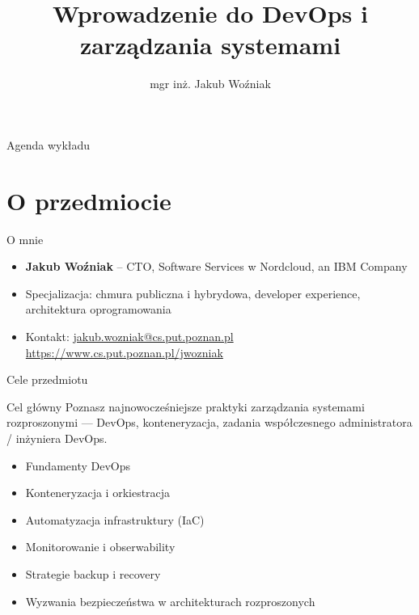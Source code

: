 \documentclass[aspectratio=169]{beamer}
\title[DevOps i administrowanie]{Wprowadzenie do DevOps i zarządzania systemami}
\author{mgr inż. Jakub Woźniak}
\institute{Instytut Informatyki, Wydział Informatyki i Telekomunikacji Politechniki Poznańskiej}
\date{}
\begin{document}
\begin{frame}
\titlepage
\end{frame}

\begin{frame}{Agenda wykładu}
\tableofcontents
\end{frame}

\section{O przedmiocie}
\begin{frame}{O mnie}
\begin{itemize}
  \item \textbf{Jakub Woźniak} -- CTO, Software Services w Nordcloud, an IBM Company
  \item Specjalizacja: chmura publiczna i hybrydowa, developer experience, architektura oprogramowania
  \item Kontakt: \href{mailto:jakub.wozniak@cs.put.poznan.pl}{jakub.wozniak@cs.put.poznan.pl}\\\url{https://www.cs.put.poznan.pl/jwozniak}
\end{itemize}

\end{frame}

\begin{frame}{Cele przedmiotu}
\begin{block}{Cel główny}
Poznasz najnowocześniejsze praktyki zarządzania systemami rozproszonymi — DevOps, konteneryzacja, zadania współczesnego administratora / inżyniera DevOps.
\end{block}

\begin{itemize}
    \item Fundamenty DevOps
    \item Konteneryzacja i orkiestracja
    \item Automatyzacja infrastruktury (IaC)
    \item Monitorowanie i obserwability
    \item Strategie backup i recovery
    \item Wyzwania bezpieczeństwa w architekturach rozproszonych
\end{itemize}
\end{frame}
\end{document}
